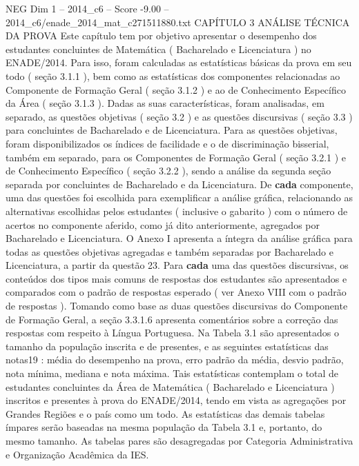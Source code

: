 \begin{textsample}{NEG Dim 1 – 2014\_c6 – Score -9.00 – 2014\_c6/enade\_2014\_mat\_c271511880.txt}  \label{ex:f1_neg_009}
CAPÍTULO 3 ANÁLISE TÉCNICA DA PROVA Este capítulo tem por objetivo apresentar o desempenho dos estudantes concluintes de Matemática ( Bacharelado e Licenciatura ) no ENADE/2014.
Para isso, foram calculadas as estatísticas básicas da prova em seu todo ( seção 3.1.1 ), bem como as estatísticas dos componentes relacionadas ao Componente de Formação Geral ( seção 3.1.2 ) e ao de Conhecimento Específico da Área ( seção 3.1.3 ).
Dadas as suas características, foram analisadas, em separado, as questões objetivas ( seção 3.2 ) e as questões discursivas ( seção 3.3 ) para concluintes de Bacharelado e de Licenciatura.
Para as questões objetivas, foram disponibilizados os índices de facilidade e o de discriminação bisserial, também em separado, para os Componentes de Formação Geral ( seção 3.2.1 ) e de Conhecimento Específico ( seção 3.2.2 ), sendo a análise da segunda seção separada por concluintes de Bacharelado e da Licenciatura.
De \textbf{cada} componente, uma das questões foi escolhida para exemplificar a análise gráfica, relacionando as alternativas escolhidas pelos estudantes ( inclusive o gabarito ) com o número de acertos no componente aferido, como já dito anteriormente, agregados por Bacharelado e Licenciatura.
O Anexo I apresenta a íntegra da análise gráfica para todas as questões objetivas agregadas e também separadas por Bacharelado e Licenciatura, a partir da questão 23.
Para \textbf{cada} uma das questões discursivas, os conteúdos dos tipos mais comuns de respostas dos estudantes são apresentados e comparados com o padrão de respostas esperado ( ver Anexo VIII com o padrão de respostas ).
Tomando como base as duas questões discursivas do Componente de Formação Geral, a seção 3.3.1.6 apresenta comentários sobre a correção das respostas com respeito à Língua Portuguesa.
Na Tabela 3.1 são apresentados o tamanho da população inscrita e de presentes, e as seguintes estatísticas das notas19 : média do desempenho na prova, erro padrão da média, desvio padrão, nota mínima, mediana e nota máxima.
Tais estatísticas contemplam o total de estudantes concluintes da Área de Matemática ( Bacharelado e Licenciatura ) inscritos e presentes à prova do ENADE/2014, tendo em vista as agregações por Grandes Regiões e o país como um todo.
As estatísticas das demais tabelas ímpares serão baseadas na mesma população da Tabela 3.1 e, portanto, do mesmo tamanho.
As tabelas pares são desagregadas por Categoria Administrativa e Organização Acadêmica da IES.

\end{textsample}
